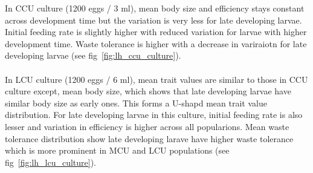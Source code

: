 In CCU culture (1200 eggs / 3 ml), mean body size and efficiency stays constant across development time but the variation is very less for late developing larvae. Initial feeding rate is slightly higher with reduced variation for larvae with higher development time. Waste tolerance is higher with a decrease in variraiotn for late developing larvae (see fig~\ref{fig:lh_ccu_culture}). \\\\
In LCU culture (1200 eggs / 6 ml), mean trait values are similar to those in CCU culture except, mean body size, which shows that late developing larvae have similar body size as early ones. This forms a U-shapd mean trait value distribution. For late developing larvae in this culture, initial feeding rate is also lesser and variation in efficiency is higher across all popularions. Mean waste tolerance distribution show late developing larave have higher waste tolerance which is more prominent in MCU and LCU populations (see fig~\ref{fig:lh_lcu_culture}).
